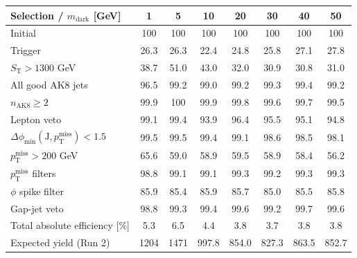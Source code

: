 {\footnotesize\setlength{\tabcolsep}{1.45pt}\renewcommand{\arraystretch}{0.82}%
\begin{tabular}{@{}lccccccc@{}}
\hline
Selection / $m_{\mathrm{dark}}$ [GeV] & 1 & 5 & 10 & 20 & 30 & 40 & 50 \\
\hline
Initial & 100 & 100 & 100 & 100 & 100 & 100 & 100 \\
Trigger & 26.3 & 26.3 & 22.4 & 24.8 & 25.8 & 27.1 & 27.8 \\
$S_{\mathrm{T}}>1300$ GeV & 38.7 & 51.0 & 43.0 & 32.0 & 30.9 & 30.8 & 31.0 \\
All good AK8 jets & 96.5 & 99.2 & 99.0 & 99.2 & 99.3 & 99.4 & 99.2 \\
$n_{\mathrm{AK8}}\geq 2$ & 99.9 & 100 & 99.9 & 99.8 & 99.6 & 99.7 & 99.5 \\
Lepton veto & 99.1 & 99.4 & 93.9 & 96.4 & 95.5 & 95.1 & 94.8 \\
$\Delta\phi_{\min}(\mathrm{J},p_{\mathrm{T}}^{\mathrm{miss}})<1.5$ & 99.5 & 99.5 & 99.4 & 99.1 & 98.6 & 98.5 & 98.1 \\
$p_{\mathrm{T}}^{\mathrm{miss}}>200$ GeV & 65.6 & 59.0 & 58.9 & 59.5 & 58.9 & 58.4 & 56.2 \\
$p_{\mathrm{T}}^{\mathrm{miss}}$ filters & 98.8 & 99.1 & 99.1 & 99.3 & 99.2 & 99.3 & 99.3 \\
$\phi$ spike filter & 85.9 & 85.4 & 85.9 & 85.7 & 85.0 & 85.5 & 85.8 \\
Gap-jet veto & 98.8 & 99.3 & 99.4 & 99.6 & 99.2 & 99.7 & 99.6 \\
\hline
Total absolute efficiency [\%] & 5.3 & 6.5 & 4.4 & 3.8 & 3.7 & 3.8 & 3.8 \\
\hline
Expected yield (Run 2) & 1204 & 1471 & 997.8 & 854.0 & 827.3 & 863.5 & 852.7 \\
\hline
\end{tabular}%
}
